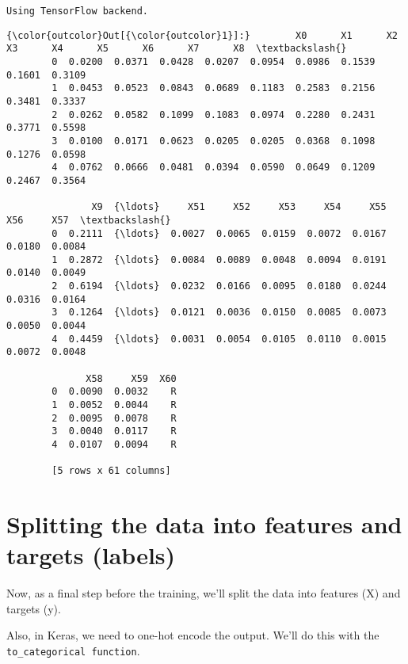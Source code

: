 \documentclass[11pt]{article}
\begin{document}
    \begin{Verbatim}[commandchars=\\\{\}]
Using TensorFlow backend.

    \end{Verbatim}

\begin{Verbatim}[commandchars=\\\{\}]
{\color{outcolor}Out[{\color{outcolor}1}]:}        X0      X1      X2      X3      X4      X5      X6      X7      X8  \textbackslash{}
        0  0.0200  0.0371  0.0428  0.0207  0.0954  0.0986  0.1539  0.1601  0.3109   
        1  0.0453  0.0523  0.0843  0.0689  0.1183  0.2583  0.2156  0.3481  0.3337   
        2  0.0262  0.0582  0.1099  0.1083  0.0974  0.2280  0.2431  0.3771  0.5598   
        3  0.0100  0.0171  0.0623  0.0205  0.0205  0.0368  0.1098  0.1276  0.0598   
        4  0.0762  0.0666  0.0481  0.0394  0.0590  0.0649  0.1209  0.2467  0.3564   
        
               X9  {\ldots}     X51     X52     X53     X54     X55     X56     X57  \textbackslash{}
        0  0.2111  {\ldots}  0.0027  0.0065  0.0159  0.0072  0.0167  0.0180  0.0084   
        1  0.2872  {\ldots}  0.0084  0.0089  0.0048  0.0094  0.0191  0.0140  0.0049   
        2  0.6194  {\ldots}  0.0232  0.0166  0.0095  0.0180  0.0244  0.0316  0.0164   
        3  0.1264  {\ldots}  0.0121  0.0036  0.0150  0.0085  0.0073  0.0050  0.0044   
        4  0.4459  {\ldots}  0.0031  0.0054  0.0105  0.0110  0.0015  0.0072  0.0048   
        
              X58     X59  X60  
        0  0.0090  0.0032    R  
        1  0.0052  0.0044    R  
        2  0.0095  0.0078    R  
        3  0.0040  0.0117    R  
        4  0.0107  0.0094    R  
        
        [5 rows x 61 columns]
\end{Verbatim}
            
    \hypertarget{splitting-the-data-into-features-and-targets-labels}{%
\section{Splitting the data into features and targets
(labels)}\label{splitting-the-data-into-features-and-targets-labels}}

Now, as a final step before the training, we'll split the data into
features (X) and targets (y).

Also, in Keras, we need to one-hot encode the output. We'll do this with
the \texttt{to\_categorical\ function}.
\end{document}

